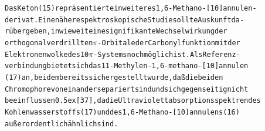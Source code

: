\documentclass[a4paper,11pt]{article}
\begin{document}
\hspace{0.75cm}
\hspace{0.75cm}
\hspace{0.75cm}
\chemnameinit{}
\begin{alltt}

Das Keton (15) repräsentiert ein weiteres 1,6-Methano-[10]annulen-
derivat. Eine nähere spektroskopische Studie sollte Auskunft da-
rüber geben, in wie weit eine signifikante Wechselwirkung der
orthogonal verdrillten \(\pi\)-Orbitale der Carbonylfunktion mit der
Elektronenwolke des 10\(\pi\)-Systems noch möglich ist. Als Referenz-
verbindung bietet sich das 11-Methylen-1,6-methano-[10]annulen
(17) an, bei dem bereits sichergestellt wurde, daß die beiden
Chromophore voneinander separiert sind und sich gegenseitig nicht
beeinflussen \raise0.5ex\hbox{[37]}, da die Ultraviolettabsorptionsspektren des
Kohlenwasserstoffs (17) und des 1,6-Methano-[10]annulens (16)
außerordentlich ähnlich sind.

\end{alltt}
\hspace{2.5cm}
\chemnameinit{}
\end{document}
